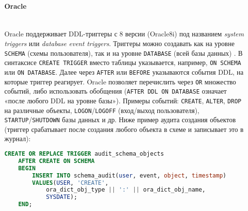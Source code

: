 \paragraph{\textbf{Oracle}} ~\\
 Oracle поддерживает DDL-триггеры с 8 версии (Oracle8i) под названием \textit{system triggers} или \textit{database event triggers}. Триггеры можно создавать как на уровне \texttt{SCHEMA} (схемы пользователя), так и на уровне \texttt{DATABASE} (всей базы данных) \autocite{oracledbdoc7}. 
 В синтаксисе \texttt{CREATE TRIGGER} вместо таблицы указывается, например, \texttt{ON SCHEMA} или \texttt{ON DATABASE}. Далее через \texttt{AFTER} или \texttt{BEFORE} указываются события DDL, на которые триггер реагирует. Oracle позволяет перечислить через \texttt{OR} множество событий, либо использовать обобщения (\texttt{AFTER DDL ON DATABASE} означает «после любого DDL на уровне базы»). Примеры событий: \texttt{CREATE}, \texttt{ALTER}, \texttt{DROP} на различные объекты, \texttt{LOGON}/\texttt{LOGOFF} (вход/выход пользователя), \texttt{STARTUP}/\texttt{SHUTDOWN} базы данных и др. Ниже пример аудита создания объектов (триггер срабатывает после создания любого объекта в схеме и записывает это в журнал):

 \begin{lstlisting}[language=SQL]
    CREATE OR REPLACE TRIGGER audit_schema_objects
    AFTER CREATE ON SCHEMA
    BEGIN
        INSERT INTO schema_audit(user, event, object, timestamp)
        VALUES(USER, 'CREATE',
            ora_dict_obj_type || ':' || ora_dict_obj_name,
            SYSDATE);
    END;
 \end{lstlisting}

